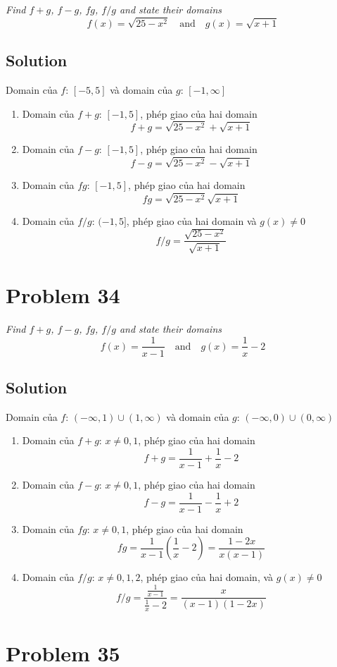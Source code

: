 \documentclass[11pt]{article}
\newcommand{\soln}{\subsection*}
\newcommand{\qn}{\textit}
\begin{document}
\qn{Find $f+g$, $f-g$, $fg$, $f/g$ and state their domains $$f(x)=\sqrt{25-x^2} \quad \text{and} \quad g(x)=\sqrt{x+1}$$}

\soln{Solution}
Domain của $f$: $[-5,5]$ và domain của $g$: $[-1, \infty]$
\begin{enumerate}
	\item Domain của $f+g$: $[-1,5]$, phép giao của hai domain $$f+g=\sqrt{25-x^2}+\sqrt{x+1}$$
	
	\item Domain của $f-g$: $[-1,5]$, phép giao của hai domain $$f-g=\sqrt{25-x^2}-\sqrt{x+1}$$
	
	\item Domain của $fg$: $[-1,5]$, phép giao của hai domain $$fg=\sqrt{25-x^2}\sqrt{x+1}$$
	
	\item Domain của $f/g$: $(-1,5]$, phép giao của hai domain và $g(x) \ne 0$ $$f/g=\frac{\sqrt{25-x^2}}{\sqrt{x+1}}$$
\end{enumerate}

\section*{Problem 34}

\qn{Find $f+g$, $f-g$, $fg$, $f/g$ and state their domains $$f(x)=\frac{1}{x-1} \quad \text{and} \quad g(x)=\frac{1}{x}-2$$}

\soln{Solution}
Domain của $f$: $(-\infty, 1) \cup (1, \infty)$ và domain của $g$: $(-\infty, 0) \cup (0, \infty)$
\begin{enumerate}
	\item Domain của $f+g$: $x \ne 0, 1$, phép giao của hai domain $$f+g=\frac{1}{x-1}+\frac{1}{x}-2$$
	
	\item Domain của $f-g$: $x \ne 0, 1$, phép giao của hai domain $$f-g=\frac{1}{x-1}-\frac{1}{x}+2$$
	
	\item Domain của $fg$: $x \ne 0, 1$, phép giao của hai domain $$fg=\frac{1}{x-1}(\frac{1}{x}-2)=\frac{1-2x}{x(x-1)}$$
	
	\item Domain của $f/g$: $x \ne 0, 1, 2$, phép giao của hai domain, và $g(x) \ne 0$ $$f/g=\frac{\frac{1}{x-1}}{\frac{1}{x}-2}=\frac{x}{(x-1)(1-2x)}$$
\end{enumerate}

\section*{Problem 35}
\end{document}
